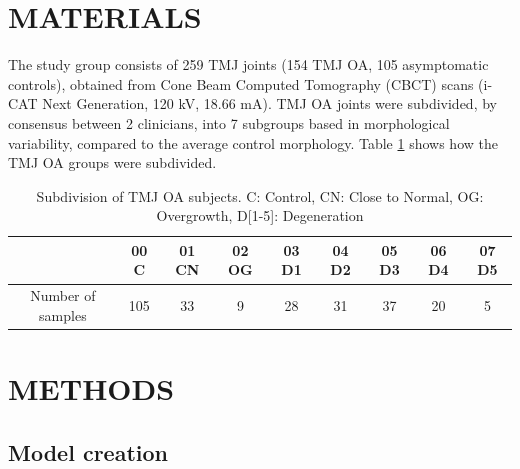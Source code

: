 \documentclass[]{spie}  %
\begin{document}
\section{MATERIALS}

The study group consists of 259 TMJ joints (154 TMJ OA, 105 asymptomatic controls), obtained from Cone Beam Computed Tomography (CBCT) scans (i-CAT Next Generation, 120 kV, 18.66 mA). TMJ OA joints were subdivided, by consensus between 2 clinicians, into 7 subgroups based in morphological variability, compared to the average control morphology.
Table \ref{tab:subjects} shows how the TMJ OA groups were subdivided.

\begin{table}[]
\caption{Subdivision of TMJ OA subjects. 
C: Control, CN: Close to Normal, OG: Overgrowth, D[1-5]: Degeneration}
\label{tab:subjects}
\begin{center}   
\begin{tabular}{|c|c|c|c|c|c|c|c|c|}
\hline
 & 00 C & 01 CN & 02 OG & 03 D1 & 04 D2 & 05 D3 & 06 D4 & 07 D5  \\
\hline
Number of samples & 105 & 33 & 9 & 28 & 31 & 37 & 20 & 5 \\
\hline
\end{tabular}
\end{center}
\end{table}

\section{METHODS} 

\subsection{Model creation}
\end{document}
